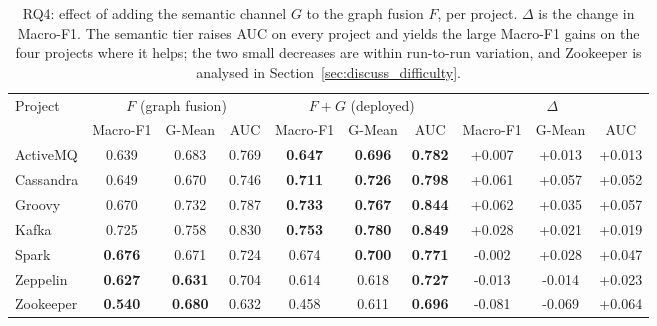 \documentclass[final,5p,times,twocolumn]{elsarticle}
\theoremstyle{plain}
\begin{document}
\begin{table}[t]\centering\small\setlength{\tabcolsep}{6pt}
\caption{RQ4: effect of adding the semantic channel $G$ to the graph fusion $F$, per project. $\Delta$ is the change in Macro-F1. The semantic tier raises AUC on every project and yields the large Macro-F1 gains on the four projects where it helps; the two small decreases are within run-to-run variation, and Zookeeper is analysed in Section~\ref{sec:discuss_difficulty}.}
\label{tab:rq4_fg_g50}
\begin{tabular}{lccccccccc}
\toprule
\multirow{2}{*}{Project} & \multicolumn{3}{c}{$F$ (graph fusion)} & \multicolumn{3}{c}{$F{+}G$ (deployed)} & \multicolumn{3}{c}{$\Delta$} \\
\cmidrule(lr){2-4}\cmidrule(lr){5-7}\cmidrule(lr){8-10}
 & Macro-F1 & G-Mean & AUC & Macro-F1 & G-Mean & AUC & Macro-F1 & G-Mean & AUC \\ \midrule
ActiveMQ & 0.639 & 0.683 & 0.769 & \textbf{0.647} & \textbf{0.696} & \textbf{0.782} & \textcolor{gainGreen}{+0.007} & \textcolor{gainGreen}{+0.013} & \textcolor{gainGreen}{+0.013} \\
Cassandra & 0.649 & 0.670 & 0.746 & \textbf{0.711} & \textbf{0.726} & \textbf{0.798} & \textcolor{gainGreen}{+0.061} & \textcolor{gainGreen}{+0.057} & \textcolor{gainGreen}{+0.052} \\
Groovy & 0.670 & 0.732 & 0.787 & \textbf{0.733} & \textbf{0.767} & \textbf{0.844} & \textcolor{gainGreen}{+0.062} & \textcolor{gainGreen}{+0.035} & \textcolor{gainGreen}{+0.057} \\
Kafka & 0.725 & 0.758 & 0.830 & \textbf{0.753} & \textbf{0.780} & \textbf{0.849} & \textcolor{gainGreen}{+0.028} & \textcolor{gainGreen}{+0.021} & \textcolor{gainGreen}{+0.019} \\
Spark & \textbf{0.676} & 0.671 & 0.724 & 0.674 & \textbf{0.700} & \textbf{0.771} & -0.002 & \textcolor{gainGreen}{+0.028} & \textcolor{gainGreen}{+0.047} \\
Zeppelin & \textbf{0.627} & \textbf{0.631} & 0.704 & 0.614 & 0.618 & \textbf{0.727} & -0.013 & -0.014 & \textcolor{gainGreen}{+0.023} \\
Zookeeper & \textbf{0.540} & \textbf{0.680} & 0.632 & 0.458 & 0.611 & \textbf{0.696} & -0.081 & -0.069 & \textcolor{gainGreen}{+0.064} \\
\bottomrule
\end{tabular}
\end{table}
\end{document}
